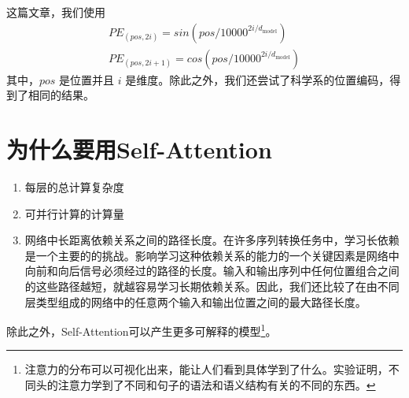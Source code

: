 \documentclass[a4paper,UTF8,no-math]{ctexart}
\newcommand{\dmodel}{d_{\text{model}}}
\begin{document}
	这篇文章，我们使用
	\begin{align*}
	PE_{(pos,2i)} = sin(pos / 10000^{2i/\dmodel}) \\
	PE_{(pos,2i+1)} = cos(pos / 10000^{2i/\dmodel})
	\end{align*}其中，$pos$ 是位置并且 $i$ 是维度。除此之外，我们还尝试了科学系的位置编码，得到了相同的结果。
	
	\section{为什么要用Self-Attention}
	
	\begin{enumerate}
		\item 每层的总计算复杂度
		\item 可并行计算的计算量
		\item 网络中长距离依赖关系之间的路径长度。在许多序列转换任务中，学习长依赖是一个主要的的挑战。影响学习这种依赖关系的能力的一个关键因素是网络中向前和向后信号必须经过的路径的长度。输入和输出序列中任何位置组合之间的这些路径越短，就越容易学习长期依赖关系。因此，我们还比较了在由不同层类型组成的网络中的任意两个输入和输出位置之间的最大路径长度。
	\end{enumerate}
	
	除此之外，Self-Attention可以产生更多可解释的模型\footnote{注意力的分布可以可视化出来，能让人们看到具体学到了什么。实验证明，不同头的注意力学到了不同和句子的语法和语义结构有关的不同的东西。}。
	
\end{document}

